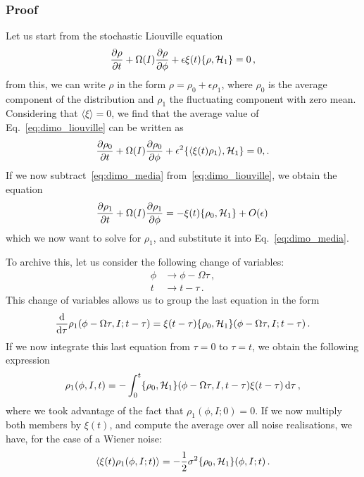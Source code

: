 \subsubsection*{Proof}
Let us start from the stochastic Liouville equation
\begin{equation}
	\pdv{\rho}{t}\/ + \Omega(I) \pdv{\rho}{\phi}\/ + \epsilon\xi(t)\{\rho,\mathcal{H}_1\} = 0\,,
	\label{eq:dimo_liouville}
\end{equation}
from this, we can write \(\rho\) in the form \(\rho = \rho_0 + \epsilon\rho_1\), where \(\rho_0\) is the average component of the distribution and \(\rho_1\) the fluctuating component with zero mean. Considering that \(\langle\xi\rangle = 0\), we find that the average value of Eq.~\eqref{eq:dimo_liouville} can be written as
\begin{equation}
	\pdv{\rho_0}{t}\/ + \Omega(I)\pdv{\rho_0}{\phi}\/ + \epsilon^2\{\langle\xi(t)\rho_1\rangle, \mathcal{H}_1\} = 0,.
	\label{eq:dimo_media}
\end{equation}
If we now subtract~\eqref{eq:dimo_media} from~\eqref{eq:dimo_liouville}, we obtain the equation
\begin{equation}
	\pdv{\rho_1}{t}\/ + \Omega(I) \pdv{\rho_1}{\phi}\/ = -\xi(t)\{\rho_0, \mathcal{H}_1\} + O(\epsilon)\,
\end{equation}
which we now want to solve for \(\rho_1\), and substitute it into Eq.~\eqref{eq:dimo_media}.

To archive this, let us consider the following change of variables:
\begin{equation}
	\begin{aligned}
		\phi &\to \phi - \Omega \tau\,, \\
		t &\to t - \tau\,.
	\end{aligned}		
\end{equation}
This change of variables allows us to group the last equation in the form
\begin{equation}
	\dv{}{\tau}\/\rho_1(\phi - \Omega \tau, I; t - \tau) = \xi(t- \tau)\{\rho_0, \mathcal{H}_1\}(\phi - \Omega \tau, I; t - \tau)\,.
\end{equation}
If we now integrate this last equation from \(\tau = 0\) to \(\tau = t\), we obtain the following expression
\begin{equation}
	\rho_1(\phi, I, t) = -\int_0^t\{\rho_0, \mathcal{H}_1\}(\phi - \Omega \tau, I, t - \tau)\xi(t-\tau)\,\mathrm{d}\tau\,,
\end{equation}
where we took advantage of the fact that \(\rho_1(\phi, I; 0)=0\). If we now multiply both members by \(\xi(t)\), and compute the average over all noise realisations, we have, for the case of a Wiener noise:
\begin{equation}
	\langle \xi(t)\rho_1(\phi, I; t) \rangle = -\frac{1}{2}\sigma^2 \{\rho_0, \mathcal{H}_1\}(\phi, I; t)\,.
\end{equation}

